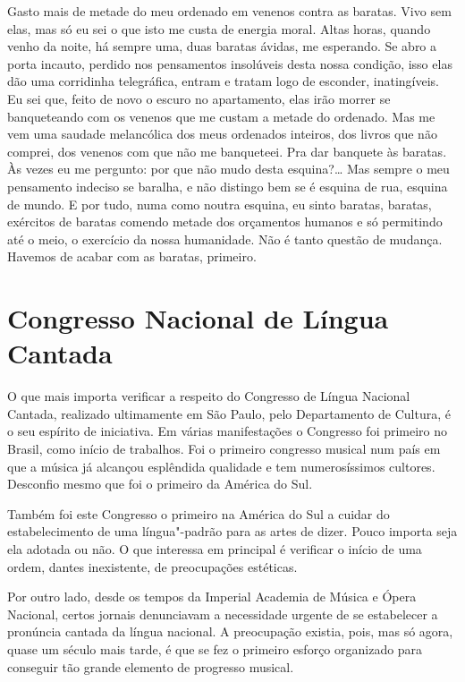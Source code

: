 Gasto mais de metade do meu ordenado em venenos contra as baratas. Vivo
sem elas, mas só eu sei o que isto me custa de energia moral. Altas
horas, quando venho da noite, há sempre uma, duas baratas ávidas, me
esperando. Se abro a porta incauto, perdido nos pensamentos insolúveis
desta nossa condição, isso elas dão uma corridinha telegráfica, entram e
tratam logo de esconder, inatingíveis. Eu sei que, feito de novo o
escuro no apartamento, elas irão morrer se banqueteando com os venenos
que me custam a metade do ordenado. Mas me vem uma saudade melancólica
dos meus ordenados inteiros, dos livros que não comprei, dos venenos com
que não me banqueteei. Pra dar banquete às baratas. Às vezes eu me
pergunto: por que não mudo desta esquina?\ldots{} Mas sempre o meu pensamento
indeciso se baralha, e não distingo bem se é esquina de rua, esquina de
mundo. E por tudo, numa como noutra esquina, eu sinto baratas, baratas,
exércitos de baratas comendo metade dos orçamentos humanos e só
permitindo até o meio, o exercício da nossa humanidade. Não é tanto
questão de mudança. Havemos de acabar com as baratas, primeiro.

\chapter{Congresso Nacional de Língua Cantada}

O que mais importa verificar a respeito do Congresso de Língua Nacional
Cantada, realizado ultimamente em São Paulo, pelo Departamento de
Cultura, é o seu espírito de iniciativa. Em várias manifestações o
Congresso foi primeiro no Brasil, como início de trabalhos. Foi o
primeiro congresso musical num país em que a música já alcançou
esplêndida qualidade e tem numerosíssimos cultores. Desconfio mesmo que
foi o primeiro da América do Sul.

Também foi este Congresso o primeiro na América do Sul a cuidar do
estabelecimento de uma língua"-padrão para as artes de dizer. Pouco
importa seja ela adotada ou não. O que interessa em principal é
verificar o início de uma ordem, dantes inexistente, de preocupações
estéticas.

Por outro lado, desde os tempos da Imperial Academia de Música e Ópera
Nacional, certos jornais denunciavam a necessidade urgente de se
estabelecer a pronúncia cantada da língua nacional. A preocupação
existia, pois, mas só agora, quase um século mais tarde, é que se fez o
primeiro esforço organizado para conseguir tão grande elemento de
progresso musical.

